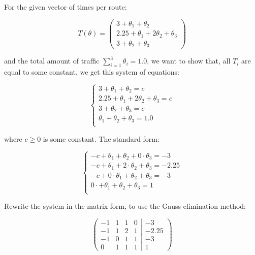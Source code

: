 \documentclass{article}
\begin{document}
For the given vector of times per route: 

$$
T(\theta)=\begin{pmatrix}
3 + \theta_{1} + \theta_{2} \\
2.25 + \theta_{1} + 2\theta_{2} + \theta_{3} \\
3+\theta_{2}+\theta_{3}
\end{pmatrix}
$$

and the total amount of traffic $\sum_{i=1}^{3}\theta_{i}=1.0$, we want to show that, all $T_{i}$ are equal to some constant, we get this system of equations:

$$
\begin{cases} 
3 + \theta_{1} + \theta_{2} = c \\ 
2.25 + \theta_{1} + 2\theta_{2} + \theta_{3} = c \\ 
3 + \theta_{2} + \theta_{3} = c \\
\theta_{1} + \theta_{2} + \theta_{3} = 1.0 \\
\end{cases}
$$

where $c \geq 0$ is some constant. The standard form:

$$
\begin{cases} 
-c + \theta_{1} + \theta_{2} + 0\cdot\theta_{3} = -3 \\ 
-c + \theta_{1} + 2\cdot\theta_{2} + \theta_{3} = -2.25 \\ 
-c + 0\cdot\theta_{1} + \theta_{2} + \theta_{3} = -3 \\
0\cdot + \theta_{1} + \theta_{2} + \theta_{3} = 1 \\
\end{cases}
$$

Rewrite the system in the matrix form, to use the Gauss elimination method:

\begin{equation*}
\left(
  \begin{matrix}
  -1 & 1 & 1 & 0 \\
  -1 & 1 & 2 & 1 \\
  -1 & 0 & 1 & 1 \\
  0 & 1 & 1 & 1
  \end{matrix}
  \right.\left|\left.
  \begin{matrix}
  -3 \\ -2.25 \\ -3 \\ 1 
  \end{matrix}
  \right)\right.
\end{equation*}
\end{document}
